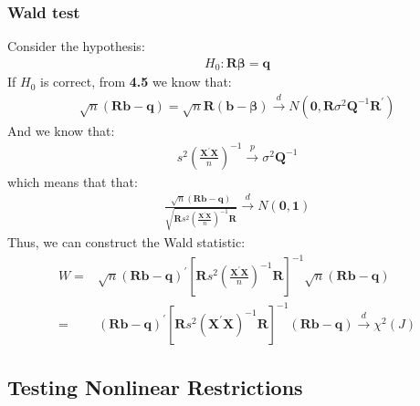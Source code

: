 \documentclass{article}
\begin{document}
\subsubsection{Wald test}
Consider the hypothesis:
	\begin{align*}
		H_0: \boldsymbol{R} \boldsymbol{\beta} = \boldsymbol{q}
	\end{align*}
If $H_0$ is correct, from \textbf{4.5} we know that:
	\begin{align*}
		\sqrt{n}(\boldsymbol{R} \boldsymbol{b} - \boldsymbol{q}) = \sqrt{n}\boldsymbol{R}(\boldsymbol{b} - \boldsymbol{\beta}) \xrightarrow{d} N(\boldsymbol{0}, \boldsymbol{R}\sigma^2 \boldsymbol{Q}^{-1} \boldsymbol{R}^\prime)
	\end{align*}
And we know that:
	\begin{align*}
		s^2 \left(\frac{\boldsymbol{X}^\prime \boldsymbol{X}}{n}\right)^{-1} \xrightarrow{p} \sigma^2 \boldsymbol{Q}^{-1}
	\end{align*}
which means that that:
	\begin{align*}
		\frac{\sqrt{n}(\boldsymbol{R} \boldsymbol{b} - \boldsymbol{q})}{\sqrt{\boldsymbol{R} s^2 \left(\frac{\boldsymbol{X}^\prime \boldsymbol{X}}{n}\right)^{-1} \boldsymbol{R}}} \xrightarrow{d} N(\boldsymbol{0},\boldsymbol{1} )
	\end{align*}
Thus, we can construct the Wald statistic:
	\begin{align*}
		W = &\sqrt{n}(\boldsymbol{R} \boldsymbol{b} - \boldsymbol{q})^\prime \left[\boldsymbol{R} s^2 \left(\frac{\boldsymbol{X}^\prime \boldsymbol{X}}{n}\right)^{-1} \boldsymbol{R}\right]^{-1} \sqrt{n}(\boldsymbol{R} \boldsymbol{b} - \boldsymbol{q})\\= &
		(\boldsymbol{R} \boldsymbol{b} - \boldsymbol{q})^\prime \left[\boldsymbol{R} s^2 \left(\boldsymbol{X}^\prime \boldsymbol{X}\right)^{-1} \boldsymbol{R}\right]^{-1}(\boldsymbol{R} \boldsymbol{b} - \boldsymbol{q}) \xrightarrow{d} \chi^2(J)
	\end{align*}


\subsection{Testing Nonlinear Restrictions}
\end{document}
